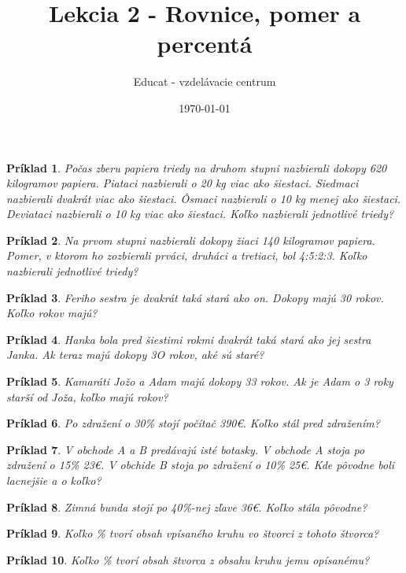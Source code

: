 \documentclass{article}
\title{Lekcia 2 - Rovnice, pomer a percentá}
\date{\today}
\author{Educat - vzdelávacie centrum}
\newtheorem{example}{Príklad}
\begin{document}
	\maketitle
	
	\begin{example}
		Počas zberu papiera triedy na druhom stupni nazbierali dokopy 620 kilogramov papiera. Piataci nazbierali o 20 kg viac ako šiestaci. Siedmaci nazbierali dvakrát viac ako šiestaci. Ôsmaci nazbierali o 10 kg menej ako šiestaci. Deviataci nazbierali o 10 kg viac ako šiestaci.
		Koľko nazbierali jednotlivé triedy?
	\end{example}
	
	\begin{example}
		Na prvom stupni nazbierali dokopy žiaci 140 kilogramov papiera. Pomer, v ktorom ho zozbierali prváci, druháci a tretiaci, bol 4:5:2:3. Koľko nazbierali jednotlivé triedy?
	\end{example}
	
	\begin{example}
		Feriho sestra je dvakrát taká stará ako on. Dokopy majú 30 rokov. Koľko rokov majú?
	\end{example}
	
	\begin{example}
		Hanka bola pred šiestimi rokmi dvakrát taká stará ako jej sestra Janka. Ak teraz majú dokopy 3O rokov, aké sú staré?
	\end{example}
	
	\begin{example}
		Kamaráti Jožo a Adam majú dokopy 33 rokov. Ak je Adam o 3 roky starší od Joža, koľko majú rokov?
	\end{example}
	
	\begin{example}
		Po zdražení o 30\% stojí počítač 390€. Koľko stál pred zdražením?
	\end{example}
	
	\begin{example}
		V obchode A a B predávajú isté botasky. V obchode A stoja po zdražení o 15\% 23€. V obchide B stoja po zdražení o 10\% 25€. Kde pôvodne boli lacnejšie a o koľko?
	\end{example}
	
	\begin{example}
		Zimná bunda stojí po 40\%-nej zľave 36€. Koľko stála pôvodne?
	\end{example}
	
	\begin{example}
		Koľko \% tvorí obsah vpísaného kruhu vo štvorci z tohoto štvorca?
	\end{example}
	
	\begin{example}
		Koľko \% tvorí obsah štvorca z obsahu kruhu jemu opísanému?
	\end{example}
\end{document}
